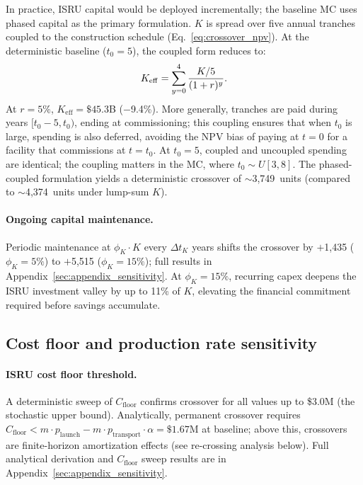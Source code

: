 \documentclass[5p,twocolumn]{elsarticle}
\begin{document}
In practice, ISRU capital would be deployed incrementally; the baseline MC uses phased capital as the primary formulation. $K$ is spread over five annual tranches coupled to the construction schedule (Eq.~\ref{eq:crossover_npv}). At the deterministic baseline ($t_0 = 5$), the coupled form reduces to:
\begin{equation}\small
  K_{\mathrm{eff}} = \sum_{y=0}^{4} \frac{K/5}{(1+r)^y}.
  \label{eq:phased_capital}
\end{equation}
At $r = 5\%$, $K_{\mathrm{eff}} = \$45.3$B ($-$9.4\%). More generally, tranches are paid during years $[t_0 - 5, t_0)$, ending at commissioning; this coupling ensures that when $t_0$ is large, spending is also deferred, avoiding the NPV bias of paying at $t = 0$ for a facility that commissions at $t = t_0$. At $t_0 = 5$, coupled and uncoupled spending are identical; the coupling matters in the MC, where $t_0 \sim U[3,8]$. The phased-coupled formulation yields a deterministic crossover of $\sim$3{,}749~units (compared to $\sim$4{,}374~units under lump-sum $K$).

\paragraph{Ongoing capital maintenance.} Periodic maintenance at $\phi_K \cdot K$ every $\Delta t_K$ years shifts the crossover by $+$1{,}435 ($\phi_K = 5\%$) to $+$5{,}515 ($\phi_K = 15\%$); full results in Appendix~\ref{sec:appendix_sensitivity}. At $\phi_K = 15\%$, recurring capex deepens the ISRU investment valley by up to 11\% of $K$, elevating the financial commitment required before savings accumulate.

\subsection{Cost floor and production rate sensitivity}
\label{sec:cfloor_prodrate}

\paragraph{ISRU cost floor threshold.} A deterministic sweep of $C_{\mathrm{floor}}$ confirms crossover for all values up to \$3.0M (the stochastic upper bound). Analytically, permanent crossover requires $C_{\mathrm{floor}} < m \cdot p_{\mathrm{launch}} - m \cdot p_{\mathrm{transport}} \cdot \alpha = \$1.67$M at baseline; above this, crossovers are finite-horizon amortization effects (see re-crossing analysis below). Full analytical derivation and $C_{\mathrm{floor}}$ sweep results are in Appendix~\ref{sec:appendix_sensitivity}.
\end{document}
